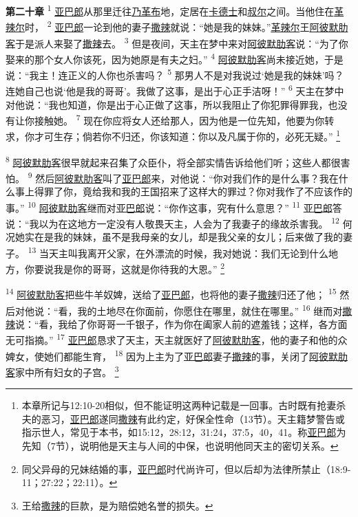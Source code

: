 \textbf{第二十章\quad}
\textsuperscript{1}
\uline{亚巴郎}从那里迁往\uline{乃革布}地，定居在\uline{卡德士}和\uline{叔尔}之间。当他住在\uline{革辣尔}时，
\textsuperscript{2}
\uline{亚巴郎}一论到他的妻子\uline{撒辣}就说：“她是我的妹妹。”\uline{革辣尔}王\uline{阿彼默}\uline{肋客}于是派人来娶了\uline{撒辣}去。
\textsuperscript{3}
但是夜间，天主在梦中来对\uline{阿彼默}\uline{肋客}说：“为了你娶来的那个女人你该死，因为她原是有夫之妇。”
\textsuperscript{4}
\uline{阿彼默}\uline{肋客}尚未接近她，于是说：“我主！连正义的人你也杀害吗？
\textsuperscript{5}
那男人不是对我说过‘她是我的妹妹’吗？连她自己也说‘他是我的哥哥’。我做了这事，是出于心正手洁呀！”
\textsuperscript{6}
天主在梦中对他说：“我也知道，你是出于心正做了这事，所以我阻止了你犯罪得罪我，也没有让你接触她。
\textsuperscript{7}
现在你应将女人还给那人，因为他是一位先知，他要为你转求，你才可生存；倘若你不归还，你该知道：你以及凡属于你的，必死无疑。”
\footnote{本章所记与12:10-20相似，但不能证明这两种记载是一回事。古时既有抢妻杀夫的恶习，\uline{亚巴郎}遂同\uline{撒辣}有此约定，好保全性命（13节）。天主籍梦警告或指示世人，常见于本书，如15:12，28:12，31:24，37:5，40，41。称\uline{亚巴郎}为先知（7节），说明他是天主与人间的中保，也说明他同天主的密切关系。}

\textsuperscript{8}
\uline{阿彼默}\uline{肋客}很早就起来召集了众臣仆，将全部实情告诉给他们听；这些人都很害怕。
\textsuperscript{9}
然后\uline{阿彼默}\uline{肋客}叫了\uline{亚巴郎}来，对他说：“你对我们作的是什么事？我在什么事上得罪了你，竟给我和我的王国招来了这样大的罪过？你对我作了不应该作的事。”
\textsuperscript{10}
\uline{阿彼默}\uline{肋客}继而对\uline{亚巴郎}说：“你作这事，究有什么意思？”
\textsuperscript{11}
\uline{亚巴郎}答说：“我以为在这地方一定没有人敬畏天主，人会为了我妻子的缘故杀害我。
\textsuperscript{12}
何况她实在是我的妹妹，虽不是我母亲的女儿，却是我父亲的女儿；后来做了我的妻子。
\textsuperscript{13}
当天主叫我离开父家，在外漂流的时候，我对她说：我们无论到什么地方，你要说我是你的哥哥，这就是你待我的大恩。”
\footnote{同父异母的兄妹结婚的事，\uline{亚巴郎}时代尚许可，但以后却为法律所禁止（18:9-11；27:22；22:11）。}

\textsuperscript{14}
\uline{阿彼默}\uline{肋客}把些牛羊奴婢，送给了\uline{亚巴郎}，也将他的妻子\uline{撒辣}归还了他；
\textsuperscript{15}
然后对他说：“看，我的土地尽在你面前，你愿住在哪里，就住在哪里。”
\textsuperscript{16}
继而对\uline{撒辣}说：“看，我给了你哥哥一千银子，作为你在阖家人前的遮羞钱；这样，各方面无可指摘。”
\textsuperscript{17}
\uline{亚巴郎}恳求了天主，天主就医好了\uline{阿彼默}\uline{肋客}，他的妻子和他的众婢女，使她们都能生育，
\textsuperscript{18}
因为上主为了\uline{亚巴郎}妻子\uline{撒辣}的事，关闭了\uline{阿彼默}\uline{肋客}家中所有妇女的子宫。
\footnote{王给\uline{撒辣}的巨款，是为赔偿她名誉的损失。}

